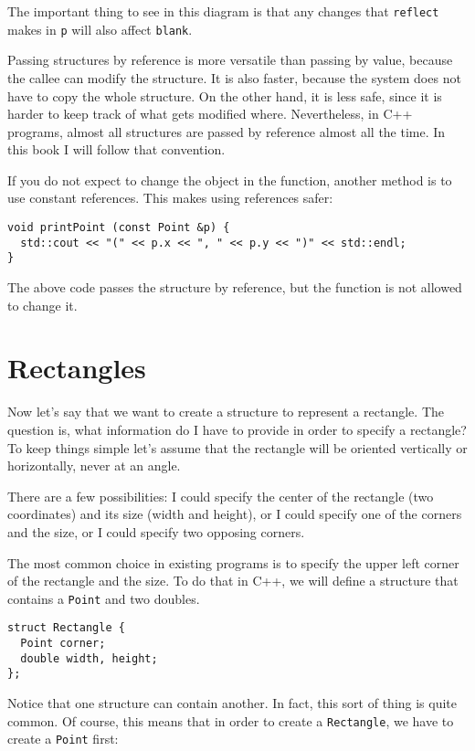 The important thing to see in this diagram is that any changes that
{\tt reflect} makes in {\tt p} will also affect {\tt blank}.

Passing structures by reference is more versatile than passing by
value, because the callee can modify the structure.  It is also
faster, because the system does not have to copy the whole
structure.  On the other hand, it is less safe, since it is harder to
keep track of what gets modified where.  Nevertheless, in C++
programs, almost all structures are passed by reference almost all the
time.  In this book I will follow that convention.

If you do not expect to change the object in the function, another method is to use constant references. This makes using references safer:
\begin{verbatim}
void printPoint (const Point &p) {
  std::cout << "(" << p.x << ", " << p.y << ")" << std::endl;
}
\end{verbatim}
The above code passes the structure by reference, but the function is not allowed to change it. 

\section{Rectangles}

Now let's say that we want to create a structure to represent
a rectangle.  The question is, what information do I have to
provide in order to specify a rectangle?  To keep things simple
let's assume that the rectangle will be oriented vertically or
horizontally, never at an angle.

There are a few possibilities: I could specify the center of
the rectangle (two coordinates) and its size (width and height),
or I could specify one of the corners and the size, or I
could specify two opposing corners.

The most common choice in existing programs is to specify the
upper left corner of the rectangle and the size.  To do that
in C++, we will define a structure that contains a {\tt Point}
and two doubles.

\begin{verbatim}
struct Rectangle {
  Point corner;
  double width, height;
};  
\end{verbatim}
%
Notice that one structure can contain another.  In fact, this
sort of thing is quite common.  Of course, this means that in
order to create a {\tt Rectangle}, we have to create a {\tt Point}
first:

